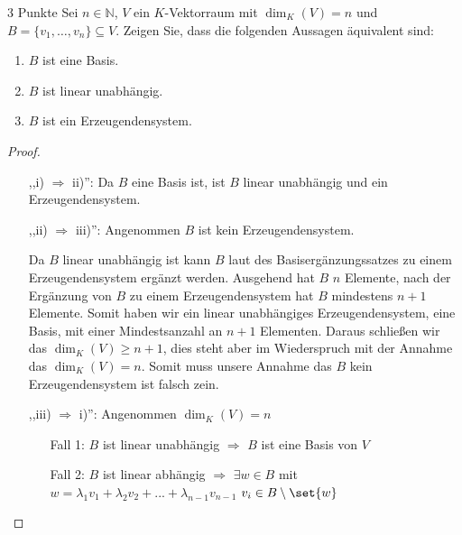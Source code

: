\documentclass{problemset}
\author{Michael van Straten}
\begin{document}
\maketitle

\begin{problem}{3 Punkte}
Sei $n \in \mathbb{N}$, $V$ ein $K$-Vektorraum mit $\dim_K(V) = n$ und $B = \{v_1, \ldots, v_n\} \subseteq V$. Zeigen Sie, dass die folgenden Aussagen äquivalent sind:
\begin{enumerate}
    \item $B$ ist eine Basis.
    \item $B$ ist linear unabhängig.
    \item $B$ ist ein Erzeugendensystem.
\end{enumerate}

\begin{proof}
    $ $

    \begin{itemize}
        \item [	,,i) $\Longrightarrow$ ii)'':]
              Da $B$ eine Basis ist, ist $B$ linear unabhängig und ein Erzeugendensystem.
        \item [,,ii) $\Longrightarrow$ iii)'':]
              Angenommen $B$ ist kein Erzeugendensystem.

              Da $B$ linear unabhängig ist kann $B$ laut des Basisergänzungssatzes zu einem
              Erzeugendensystem ergänzt werden. Ausgehend hat $B$ $n$ Elemente, nach der
              Ergänzung von $B$ zu einem Erzeugendensystem hat $B$ mindestens $n + 1$
              Elemente. Somit haben wir ein linear unabhängiges Erzeugendensystem, eine
              Basis, mit einer Mindestsanzahl an $n + 1$ Elementen. Daraus schließen wir das
              $\dim_K(V) \ge n + 1$, dies steht aber im Wiederspruch mit der Annahme das
              $\dim_K(V) = n$. Somit muss unsere Annahme das $B$ kein Erzeugendensystem ist
              falsch zein. \checkmark
        \item [	,,iii) $\Longrightarrow$ i)'':] Angenommen $\dim_K(V) = n$
              \begin{itemize}
                  \item [Fall 1:]
                        $B$ ist linear unabhängig $\Rightarrow$ $B$ ist eine Basis von $V$ \checkmark
                  \item [Fall 2:]
                        $B$ ist linear abhängig $\Rightarrow$ $\exists w \in B$ mit $w = \lambda_1 v_1 + \lambda_2 v_2 + ... + \lambda_{n-1} v_{n - 1}$ $v_i \in B \setminus \set{w}$


\end{itemize}
\end{itemize}
\end{proof}
\end{problem}
\end{document}
